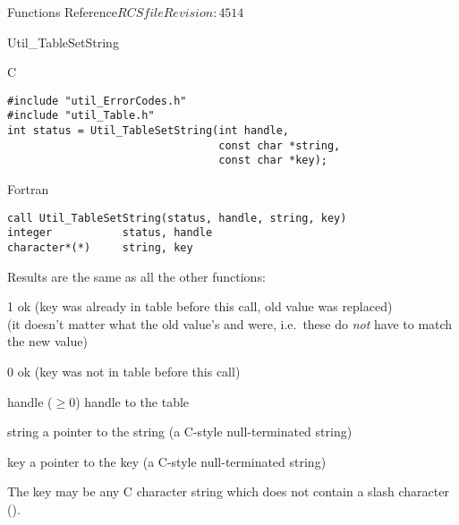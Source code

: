 \begin{cactuspart}{ Functions Reference}{$RCSfile$}{$Revision: 4514 $}
\begin{FunctionDescription}{Util\_TableSetString}
\begin{SynopsisSection}
\begin{Synopsis}{C}
\begin{verbatim}
#include "util_ErrorCodes.h"
#include "util_Table.h"
int status = Util_TableSetString(int handle,
                                 const char *string,
                                 const char *key);
\end{verbatim}
\end{Synopsis}
\begin{Synopsis}{Fortran}
\begin{verbatim}
call Util_TableSetString(status, handle, string, key)
integer           status, handle
character*(*)     string, key
\end{verbatim}
\end{Synopsis}
\end{SynopsisSection}

\begin{ResultSection}
\begin{ResultNote}
Results are the same as all the other  functions:
\end{ResultNote}
\begin{Result}{\rm 1}
ok (key was already in table before this call, old value was replaced)\\
   (it doesn't matter what the old value's  and
     were, i.e.\ these do {\em not\/} have to match
    the new value)
\end{Result}
\begin{Result}{\rm 0}
ok (key was not in table before this call)
\end{Result}
\end{ResultSection}

\begin{ParameterSection}
\begin{Parameter}{handle ($\ge 0$)}
handle to the table
\end{Parameter}
\begin{Parameter}{string}
a pointer to the string (a C-style null-terminated string)
\end{Parameter}
\begin{Parameter}{key}
a pointer to the key (a C-style null-terminated string)
\end{Parameter}
\end{ParameterSection}

\begin{Discussion}
The key may be any C character string which does not contain a slash
character ().


\end{Discussion}
\end{FunctionDescription}
\end{cactuspart}
